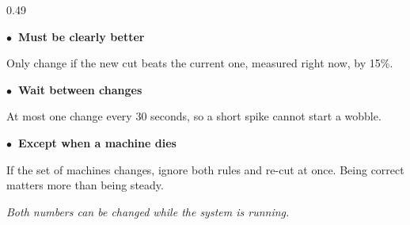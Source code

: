 \documentclass[aspectratio=169,11pt]{beamer}
\begin{document}
\begin{frame}[shrink=20]
\begin{columns}[T]
\begin{column}{0.49\textwidth}
{\begin{minipage}{\dimexpr\textwidth-14pt\relax}
      {\color{white}\bfseries\scriptsize\textcolor{keteal}{$\bullet$}\ Must be clearly better}\par
      {\scriptsize\color{white!60!keink}Only change if the new cut beats the
       current one, measured right now, by 15\%.}\par\vspace{0.5em}
      {\color{white}\bfseries\scriptsize\textcolor{keteal}{$\bullet$}\ Wait between changes}\par
      {\scriptsize\color{white!60!keink}At most one change every 30 seconds,
       so a short spike cannot start a wobble.}\par\vspace{0.5em}
      {\color{white}\bfseries\scriptsize\textcolor{keamber}{$\bullet$}\ Except when a machine dies}\par
      {\scriptsize\color{white!60!keink}If the set of machines changes,
       ignore both rules and re-cut at once. Being correct matters more than
       being steady.}\par\vspace{0.8em}
      {\tiny\itshape\color{white!52!keink}Both numbers can be changed while
       the system is running.}
      \vspace{0.4em}
    \end{minipage}}
  \end{column}
  \end{columns}
\end{frame}
\end{document}

